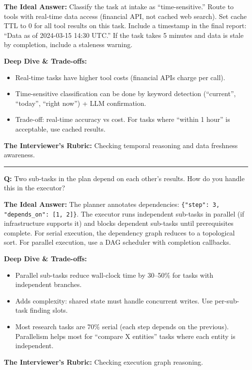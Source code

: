 \textbf{The Ideal Answer:} Classify the task at intake as ``time-sensitive.'' Route to tools with real-time data access (financial API, not cached web search). Set cache TTL to 0 for all tool results on this task. Include a timestamp in the final report: ``Data as of 2024-03-15 14:30 UTC.'' If the task takes 5 minutes and data is stale by completion, include a staleness warning.

\textbf{Deep Dive \& Trade-offs:}
\begin{itemize}
  \item Real-time tasks have higher tool costs (financial APIs charge per call).
  \item Time-sensitive classification can be done by keyword detection (``current'', ``today'', ``right now'') + LLM confirmation.
  \item Trade-off: real-time accuracy vs cost. For tasks where ``within 1 hour'' is acceptable, use cached results.
\end{itemize}

\textbf{The Interviewer's Rubric:} Checking temporal reasoning and data freshness awareness.

\bigskip\hrule\bigskip

\textbf{Q:} Two sub-tasks in the plan depend on each other's results. How do you handle this in the executor?

\textbf{The Ideal Answer:} The planner annotates dependencies: \texttt{\{"step": 3, "depends\_on": [1, 2]\}}. The executor runs independent sub-tasks in parallel (if infrastructure supports it) and blocks dependent sub-tasks until prerequisites complete. For serial execution, the dependency graph reduces to a topological sort. For parallel execution, use a DAG scheduler with completion callbacks.

\textbf{Deep Dive \& Trade-offs:}
\begin{itemize}
  \item Parallel sub-tasks reduce wall-clock time by 30--50\% for tasks with independent branches.
  \item Adds complexity: shared state must handle concurrent writes. Use per-sub-task finding slots.
  \item Most research tasks are 70\% serial (each step depends on the previous). Parallelism helps most for ``compare X entities'' tasks where each entity is independent.
\end{itemize}

\textbf{The Interviewer's Rubric:} Checking execution graph reasoning.

